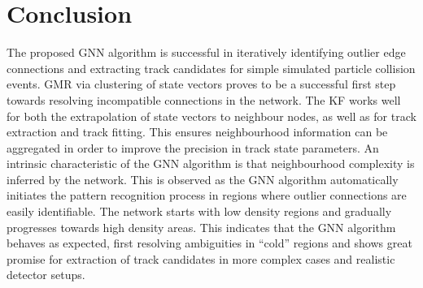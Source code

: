\newpage
\section{Conclusion}

The proposed GNN algorithm is successful in iteratively identifying outlier edge connections and extracting track candidates for simple simulated particle collision events. GMR via clustering of state vectors proves to be a successful first step towards resolving incompatible connections in the network. The KF works well for both the extrapolation of state vectors to neighbour nodes, as well as for track extraction and track fitting. This ensures neighbourhood information can be aggregated in order to improve the precision in track state parameters. An intrinsic characteristic of the GNN algorithm is that neighbourhood complexity is inferred by the network. This is observed as the GNN algorithm automatically initiates the pattern recognition process in regions where outlier connections are easily identifiable. The network starts with low density regions and gradually progresses towards high density areas. This indicates that the GNN algorithm behaves as expected, first resolving ambiguities in ``cold'' regions and shows great promise for extraction of track candidates in more complex cases and realistic detector setups.


